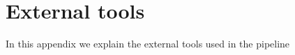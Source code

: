 \chapter{External tools}
\label{appendix:tools}
In this appendix we explain the external tools used in the pipeline